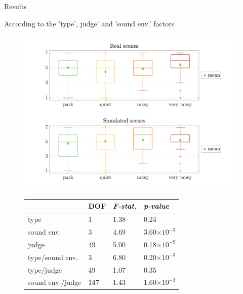 \documentclass{beamer}
\begin{document}


\begin{frame}{Results}

\begin{block}{According to the 'type', judge' and 'sound env.' factors}
\begin{figure}
\begin{flushleft}

\begin{minipage}[l]{.4\linewidth}
\includegraphics[width=\textwidth]{pictures/testPerceptif_boxplotAmbianceCOLOR_EN.pdf}
\end{minipage}%
\begin{minipage}[r]{.5\linewidth}
\footnotesize
\begin{tabular}{p{2.35cm}p{0.5cm}p{0.95cm}p{1.65cm}}
        &  DOF &  \textit{F-stat.}    &  \textit{p-value} \\
\hline
 type &  1 &  1.38 &  0.24   \\
\hline
 sound env.   &  3 &  4.69 &  3.60$\times 10^{-3}$  \\
\hline
 judge   &  49 &  5.00 &  0.18$\times 10^{-9}$  \\
\hline
 type/sound env. &  3 &  6.80 &  0.20$\times 10^{-3}$\\
\hline
 type/judge &  49 &   1.07 &   0.35\\
\hline
 sound env./judge &  147 &  1.43 &  1.60$\times 10^{-3}$\\
\end{tabular}
\label{tab:p_value_type_ambience}
\end{minipage}
\end{flushleft}
\end{figure}
\end{block}



\end{frame}
\end{document}

